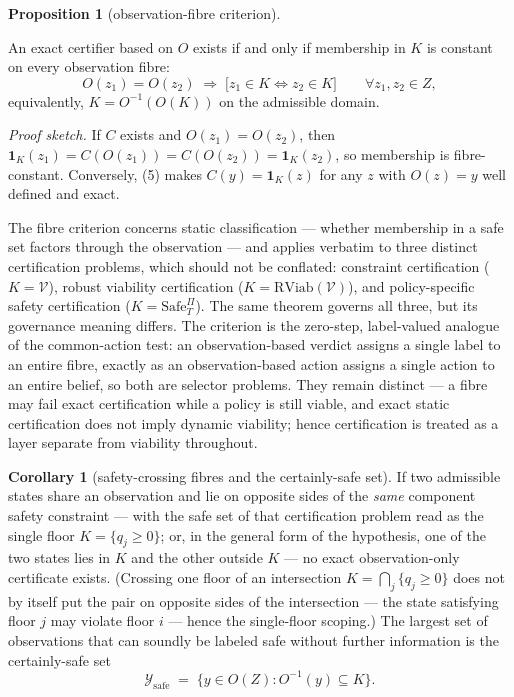 \documentclass[10pt,twocolumn]{article}
\theoremstyle{definition}
\newtheorem{proposition}{Proposition}
\newtheorem{corollary}{Corollary}
\begin{document}
\begin{proposition}[observation-fibre criterion]\label{prop:fibre}

An exact certifier
based on \(O\) exists if and only if membership in \(K\) is constant on
every observation fibre:
\[O(z_1) = O(z_2) \;\Longrightarrow\; \big[ z_1 \in K \iff z_2 \in K \big] \qquad \forall z_1, z_2 \in Z, \tag{5}\]
equivalently, \(K = O^{-1}(O(K))\) on the admissible domain.

\end{proposition}

\emph{Proof sketch.} If \(C\) exists and \(O(z_1) = O(z_2)\), then \(\mathbf{1}_K(z_1) = C(O(z_1)) = C(O(z_2)) = \mathbf{1}_K(z_2)\), so membership is fibre-constant. Conversely, (5) makes \(C(y) = \mathbf{1}_K(z)\) for any \(z\) with \(O(z) = y\) well defined and exact.

The fibre criterion concerns static classification --- whether
membership in a safe set factors through the observation --- and applies
verbatim to three distinct certification problems, which should not be
conflated: constraint certification (\(K = \mathcal{V}\)), robust
viability certification (\(K = \mathrm{RViab}(\mathcal{V})\)), and
policy-specific safety certification (\(K = \mathrm{Safe}^{\Pi}_T\)).
The same theorem governs all three, but its governance meaning differs.
The criterion is the zero-step, label-valued analogue of the
common-action test: an observation-based verdict assigns a single label
to an entire fibre, exactly as an observation-based action assigns a
single action to an entire belief, so both are selector problems. They
remain distinct --- a fibre may fail exact certification while a policy
is still viable, and exact static certification does not imply dynamic
viability; hence certification is treated as a layer separate from
viability throughout.

\begin{corollary}[safety-crossing fibres and the certainly-safe set]\label{cor:certainly-safe} If two admissible states share an observation and lie on opposite
sides of the \emph{same} component safety constraint --- with the safe
set of that certification problem read as the single floor
\(K = \{ q_j \ge 0 \}\); or, in the general form of the hypothesis, one
of the two states lies in \(K\) and the other outside \(K\) --- no exact
observation-only certificate exists. (Crossing one floor of an
intersection \(K = \bigcap_j \{ q_j \ge 0 \}\) does not by itself put
the pair on opposite sides of the intersection --- the state satisfying
floor \(j\) may violate floor \(i\) --- hence the single-floor scoping.)
The largest set of observations that can soundly be labeled safe without
further information is the certainly-safe set
\[\mathcal{Y}_{\mathrm{safe}} \;=\; \big\{ y \in O(Z) : O^{-1}(y) \subseteq K \big\}.\]

\end{corollary}
\end{document}
